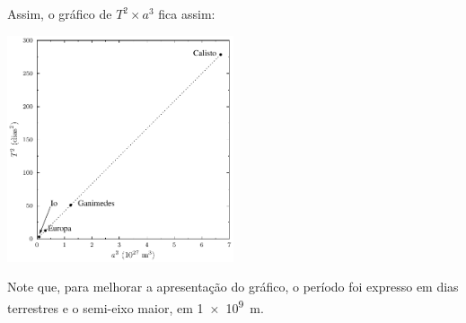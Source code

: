 \documentclass[a4paper]{article}
\begin{document}
\begin{resolucoes}
\begin{exercicio*}
  Assim, o gráfico de $T^2\times a^3$ fica assim:

  \begin{center}
  \includegraphics[width=0.5\textwidth]{Io_cia}
  \end{center}
  
  Note que, para melhorar a apresentação do gráfico, o período foi expresso em dias terrestres e o semi-eixo maior, em \SI{1e9}{\metre}.
  \end{exercicio*}
\end{resolucoes}
\end{document}
